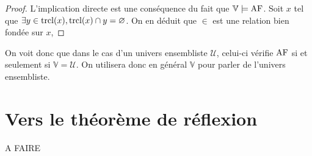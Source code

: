 \begin{proof}
  L'implication directe est une conséquence du fait que $\mathbb V\models \operatorname{AF}$.
  Soit $x$ tel que $\exists y \in \operatorname{trcl}(x), \operatorname{trcl}(x) \cap y = \varnothing$. On
  en déduit que $\in$ est une relation bien fondée sur $x$, 
\end{proof}

On voit donc que dans le cas d'un univers ensembliste $\mathcal U$, celui-ci
vérifie $\operatorname{AF}$ si et seulement si $\mathbb V = \mathcal U$. On utilisera donc en
général $\mathbb V$ pour parler de l'univers ensembliste.

\section{Vers le théorème de réflexion}

A FAIRE

